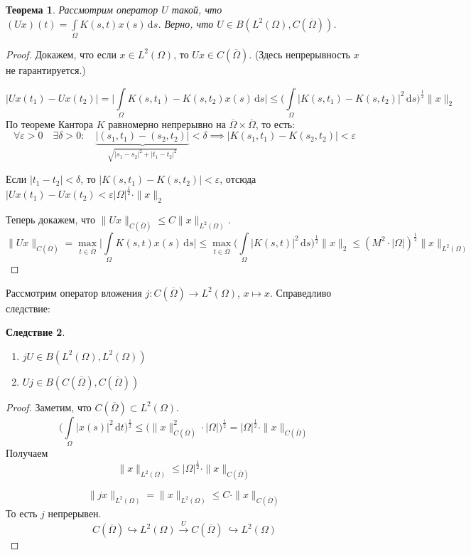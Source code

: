 \documentclass[11pt,openany,a4paper]{scrartcl}
\theoremstyle{plain}
\newtheorem{theorem}{Теорема}[section]
\newtheorem{corollary}[theorem]{Следствие}
\theoremstyle{definition}
\newcommand{\overto}[1]{\xrightarrow{#1}}
\newcommand{\dif}{\, \mathrm d}
\begin{document}
\begin{theorem}
    Рассмотрим оператор $U$ такой, что
    $(Ux)(t) = \int\limits_\Omega K(s,t)x(s) \dif s$. Верно, что
    $U \in B(L^2(\Omega), C(\overline\Omega))$.
\end{theorem}
\begin{proof}
    Докажем, что если $x \in L^2(\Omega)$, то $Ux \in C(\overline\Omega)$.
    (Здесь непрерывность $x$ не гарантируется.)
    
    $$
    |Ux(t_1) - Ux(t_2)| =
    \bigg|\int\limits_\Omega K(s, t_1) - K(s, t_2)x(s) \dif s\bigg| \leqslant
    \bigg(\int\limits_\Omega |K(s, t_1) - K(s, t_2)|^2 \dif s\bigg)^\frac{1}{2}
    \|x\|_2
    $$
    По теореме Кантора $K$ равномерно непрерывно на
    $\overline\Omega \times \overline\Omega$, то есть:
    $$
    \forall \varepsilon > 0\quad\exists \delta > 0:\quad
    \underbrace{|(s_1, t_1) - (s_2, t_2)|}_{\sqrt{|s_1 - s_2|^2 + |t_1 - t_2|^2}}
    < \delta \implies
    |K(s_1, t_1) - K(s_2, t_2)| < \varepsilon
    $$
    
    Если $|t_1 - t_2| < \delta$, то $|K(s, t_1) - K(s, t_2)| < \varepsilon$,
    отсюда $|Ux(t_1) - Ux(t_2) < \varepsilon |\Omega|^\frac{1}{2}\cdot \|x\|_2$
    
    Теперь докажем, что $\|Ux\|_{C(\overline\Omega)}
    \leqslant C \|x\|_{L^2(\Omega)}$.
    $$
    \|Ux\|_{C(\overline\Omega)} = \max\limits_{t \in \overline \Omega}
    \bigg| \int\limits_\Omega K(s, t)x(s) \dif s\bigg| \leqslant
    \max\limits_{t \in \overline \Omega} \bigg(\int\limits_\Omega |K(s, t)|^2
    \dif s\bigg)^\frac{1}{2} \|x\|_2 \leqslant
    (M^2 \cdot |\Omega|)^\frac{1}{2}\|x\|_{L^2(\Omega)}
    $$
\end{proof}

Рассмотрим оператор вложения $j: C(\overline\Omega) \to L^2(\Omega)$,
$x \mapsto x$. Справедливо следствие:

\begin{corollary}
    \begin{enumerate}
        \item $jU \in B(L^2(\Omega), L^2(\Omega))$
        \item $Uj \in B(C(\overline\Omega), C(\overline\Omega))$
    \end{enumerate}
\end{corollary}
\begin{proof}
    Заметим, что $C(\overline\Omega) \subset L^2(\Omega)$.
    $$
    \bigg(\int\limits_\Omega |x(s)|^2 \dif t\bigg)^\frac{1}{2} \leqslant
    \bigg(\|x\|_{C(\overline\Omega)}^2 \cdot |\Omega|\bigg)^\frac{1}{2} =
    |\Omega|^\frac{1}{2} \cdot \|x\|_{C(\overline\Omega)}
    $$
    Получаем
    $$
    \|x\|_{L^2(\Omega)} \leqslant
    |\Omega|^\frac{1}{2} \cdot \|x\|_{C(\overline\Omega)}
    $$

    $$
    \|jx\|_{L^2(\Omega)} = \|x\|_{L^2(\Omega)} \leqslant
    C \cdot \|x\|_{C(\overline\Omega)}
    $$
    То есть $j$ непрерывен.
    $$
    C(\overline\Omega) \hookrightarrow L^2(\Omega) \overto{U} C(\overline\Omega) \
    \hookrightarrow L^2(\Omega)
    $$
\end{proof}
\end{document}
